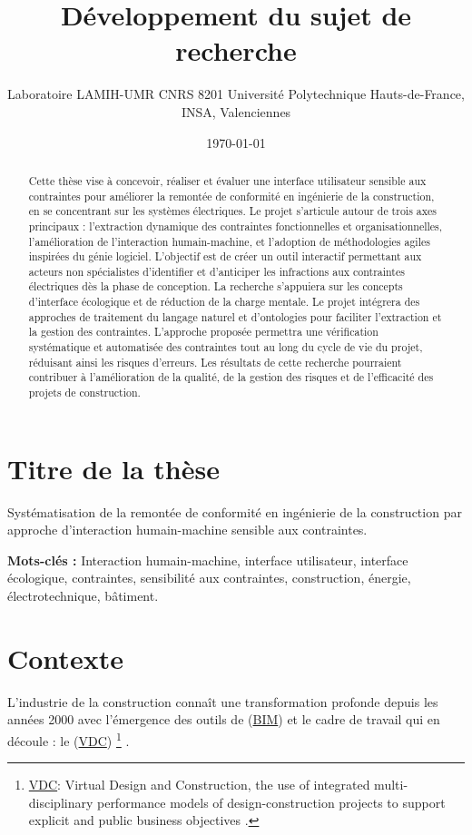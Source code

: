 \documentclass[a4paper,12pt]{article}
\author{Laboratoire LAMIH-UMR CNRS 8201 Université Polytechnique Hauts-de-France, INSA, Valenciennes}
\date{\today}
\title{Développement du sujet de recherche}
\newenvironment{keyword}{\begin{trivlist}\item[]{\bfseries Mots-clés :}}{\end{trivlist}}
\begin{document}
\maketitle
\section{Titre de la thèse}
\label{sec:org1ed4088}

Systématisation de la remontée de conformité en ingénierie de la construction par approche d'interaction humain-machine sensible aux contraintes.

\begin{abstract}
Cette thèse vise à concevoir, réaliser et évaluer une interface utilisateur sensible aux contraintes pour améliorer la remontée de conformité en ingénierie de la construction, en se concentrant sur les systèmes électriques. Le projet s'articule autour de trois axes principaux : l'extraction dynamique des contraintes fonctionnelles et organisationnelles, l'amélioration de l'interaction humain-machine, et l'adoption de méthodologies agiles inspirées du génie logiciel. L'objectif est de créer un outil interactif permettant aux acteurs non spécialistes d'identifier et d'anticiper les infractions aux contraintes électriques dès la phase de conception. La recherche s'appuiera sur les concepts d'interface écologique et de réduction de la charge mentale. Le projet intégrera des approches de traitement du langage naturel et d'ontologies pour faciliter l'extraction et la gestion des contraintes. L'approche proposée permettra une vérification systématique et automatisée des contraintes tout au long du cycle de vie du projet, réduisant ainsi les risques d'erreurs. Les résultats de cette recherche pourraient contribuer à l'amélioration de la qualité, de la gestion des risques et de l'efficacité des projets de construction.
\end{abstract}

\begin{keyword}
Interaction humain-machine, interface utilisateur, interface écologique, contraintes, sensibilité aux contraintes, construction, énergie, électrotechnique, bâtiment.
\end{keyword}
\section{Contexte}
\label{sec:orgbe5ffe8}

L'industrie de la construction connaît une transformation profonde depuis les années 2000 avec l'émergence des outils de  (\protect\hyperlink{gls-1}{\label{gls-1-use-1}BIM}) et le cadre de travail qui en découle : le  (\protect\hyperlink{gls-2}{\label{gls-2-use-1}VDC}) \footnote{\protect\hyperlink{gls-2}{\label{gls-2-use-2}VDC}: Virtual Design and Construction, the use of integrated multi-disciplinary performance models of design-construction projects to support explicit and public business objectives \autocite{delsavioVirtualDesignConstruction2022a}.} \autocite{mohamedadelIntegrationBuildingInformation2022}.
\end{document}

